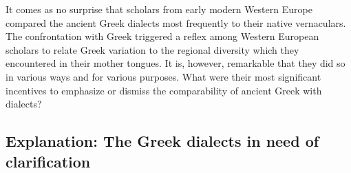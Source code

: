 It comes as no surprise that scholars from early modern Western Europe compared the ancient Greek dialects most frequently to their native vernaculars. The confrontation with Greek triggered a reflex among Western European scholars to relate Greek variation to the regional diversity which they encountered in their mother tongues. It is, however, remarkable that they did so in various ways and for various purposes. What were their most significant incentives to emphasize or dismiss the comparability of ancient Greek with  dialects?

\subsection{Explanation: The Greek dialects in need of clarification}\label{sec:8.1.1}


